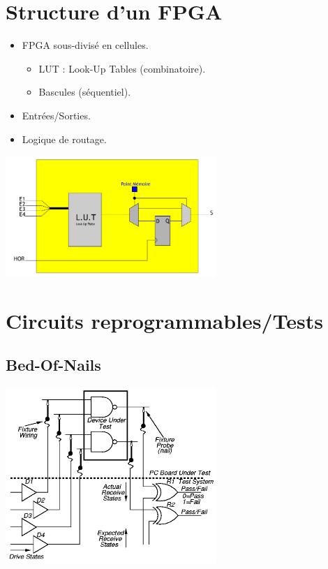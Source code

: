 \documentclass[10pt]{article}
\begin{document}
\begin{multicols}{2}
  \section{Structure d'un FPGA}
  \begin{itemize}
    \itemsep0em
    \item FPGA sous-divisé en cellules.
    \begin{itemize}

    \itemsep0em
      \item LUT : Look-Up Tables (combinatoire).
      \item Bascules (séquentiel).
    \end{itemize}
    \item Entrées/Sorties.
    \item Logique de routage.
  \end{itemize}
  \includegraphics[width=8cm]{./lut.png}
  \section{Circuits reprogrammables/Tests}
  \subsection{Bed-Of-Nails}
  \includegraphics[width=8cm]{bon.png}

\end{multicols}
\end{document}
